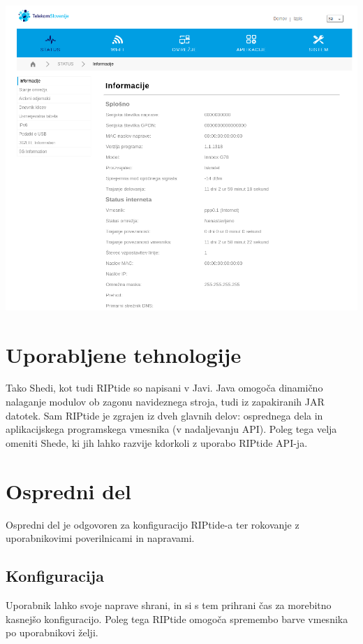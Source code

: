 \documentclass[12pt]{article}
\begin{document}
\begin{center}
	\includegraphics[scale=0.5]{slike/telekom.png}
\end{center}
\newpage

\section{Uporabljene tehnologije}
Tako Shedi, kot tudi RIPtide so napisani v Javi. Java omogoča dinamično
nalaganje modulov ob zagonu navideznega stroja, tudi iz zapakiranih JAR
datotek. Sam RIPtide je zgrajen iz dveh glavnih delov: osprednega dela 
in aplikacijskega programskega vmesnika (v nadaljevanju API).
Poleg tega velja omeniti Shede, ki jih lahko razvije kdorkoli z uporabo
RIPtide API-ja.
\newpage

\section{Ospredni del}
Ospredni del je odgovoren za konfiguracijo RIPtide-a ter rokovanje z 
uporabnikovimi poverilnicami in napravami.

\subsection{Konfiguracija}
Uporabnik lahko svoje naprave shrani, in si s tem prihrani čas za
morebitno kasnejšo konfiguracijo. Poleg tega RIPtide omogoča spremembo
barve vmesnika po uporabnikovi želji.
\end{document}
